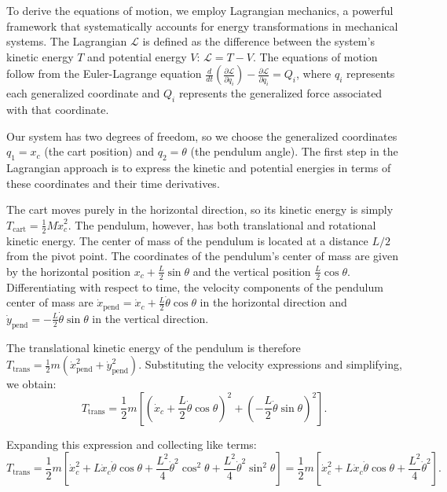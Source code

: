 To derive the equations of motion, we employ Lagrangian mechanics, a powerful framework that systematically accounts for energy transformations in mechanical systems. The Lagrangian $ \mathcal{L} $ is defined as the difference between the system's kinetic energy $T$ and potential energy $V$: $\mathcal{L} = T - V$. The equations of motion follow from the Euler-Lagrange equation $\frac{d}{dt}\left(\frac{\partial \mathcal{L}}{\partial \dot{q}_i}\right) - \frac{\partial \mathcal{L}}{\partial q_i} = Q_i$, where $q_i$ represents each generalized coordinate and $Q_i$ represents the generalized force associated with that coordinate.

Our system has two degrees of freedom, so we choose the generalized coordinates $q_1 = x_c$ (the cart position) and $q_2 = \theta$ (the pendulum angle). The first step in the Lagrangian approach is to express the kinetic and potential energies in terms of these coordinates and their time derivatives.

The cart moves purely in the horizontal direction, so its kinetic energy is simply $T_{\text{cart}} = \frac{1}{2}M\dot{x}_c^2$. The pendulum, however, has both translational and rotational kinetic energy. The center of mass of the pendulum is located at a distance $L/2$ from the pivot point. The coordinates of the pendulum's center of mass are given by the horizontal position $x_c + \frac{L}{2}\sin\theta$ and the vertical position $\frac{L}{2}\cos\theta$. Differentiating with respect to time, the velocity components of the pendulum center of mass are $\dot{x}_{\text{pend}} = \dot{x}_c + \frac{L}{2}\dot{\theta}\cos\theta$ in the horizontal direction and $\dot{y}_{\text{pend}} = -\frac{L}{2}\dot{\theta}\sin\theta$ in the vertical direction.

The translational kinetic energy of the pendulum is therefore $T_{\text{trans}} = \frac{1}{2}m\left(\dot{x}_{\text{pend}}^2 + \dot{y}_{\text{pend}}^2\right)$. Substituting the velocity expressions and simplifying, we obtain:
\begin{equation}
T_{\text{trans}} = \frac{1}{2}m\left[\left(\dot{x}_c + \frac{L}{2}\dot{\theta}\cos\theta\right)^2 + \left(-\frac{L}{2}\dot{\theta}\sin\theta\right)^2\right].
\end{equation}

Expanding this expression and collecting like terms:
\begin{equation}
T_{\text{trans}} = \frac{1}{2}m\left[\dot{x}_c^2 + L\dot{x}_c\dot{\theta}\cos\theta + \frac{L^2}{4}\dot{\theta}^2\cos^2\theta + \frac{L^2}{4}\dot{\theta}^2\sin^2\theta\right] = \frac{1}{2}m\left[\dot{x}_c^2 + L\dot{x}_c\dot{\theta}\cos\theta + \frac{L^2}{4}\dot{\theta}^2\right].
\end{equation}

